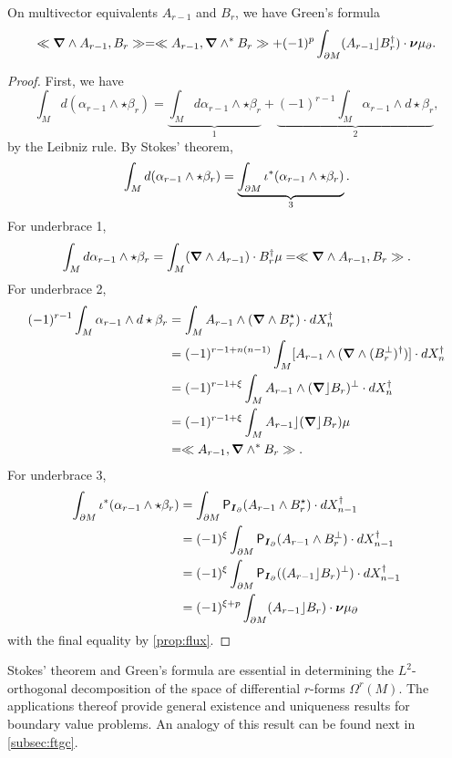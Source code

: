 \begin{proposition}
On multivector equivalents $A_{r-1}$ and $B_r$, we have Green's formula
\begin{equation}
\ll \boldsymbol{\nabla} \wedge A_{r-1}, B_r\gg = \ll A_{r-1}, \boldsymbol{\nabla} \wedge^* B_r\gg + (-1)^{p} \int_{\partial M} (A_{r-1}\rfloor B_r^\dagger) \cdot \boldsymbol{\nu} \mu_\partial.
\end{equation}
\end{proposition}
\begin{proof}
First, we have
\begin{equation}
\int_M d(\alpha_{r-1} \wedge \star \beta_r) = \underbrace{\int_M d\alpha_{r-1} \wedge \star \beta_r}_{1} + \underbrace{(-1)^{r-1} \int_M \alpha_{r-1} \wedge d \star \beta_r}_{2},
\end{equation} 
by the Leibniz rule. By Stokes' theorem,
\begin{equation}
\int_M d(\alpha_{r-1} \wedge \star \beta_r) = \underbrace{\int_{\partial M} \iota^*(\alpha_{r-1} \wedge \star \beta_r)}_{3}.
\end{equation}
For underbrace 1,
\begin{equation}
\int_M d\alpha_{r-1} \wedge \star \beta_r = \int_M (\boldsymbol{\nabla} \wedge A_{r-1}) \cdot B_r^\dagger \mu = \ll \boldsymbol{\nabla} \wedge A_{r-1}, B_r\gg.
\end{equation}
For underbrace 2,
\begin{align}
    (-1)^{r-1}\int_M \alpha_{r-1} \wedge d \star \beta_r  &= \int_M A_{r-1} \wedge (\boldsymbol{\nabla} \wedge B_r^\star) \cdot dX_n^\dagger\\
    &= (-1)^{r-1+n(n-1)} \int_M [A_{r-1} \wedge (\boldsymbol{\nabla} \wedge (B_r^\perp)^\dagger)] \cdot dX_n^\dagger\\
    &= (-1)^{r-1 + \xi} \int_M A_{r-1} \wedge (\boldsymbol{\nabla} \rfloor B_r)^\perp \cdot dX_n^\dagger\\
    &= (-1)^{r-1 + \xi} \int_M A_{r-1} \rfloor (\boldsymbol{\nabla} \rfloor B_r) \mu\\
    &= \ll A_{r-1}, \boldsymbol{\nabla} \wedge^* B_r\gg.
\end{align}
For underbrace 3,
\begin{align}
\int_{\partial M} \iota^*(\alpha_{r-1} \wedge \star \beta_r) &= \int_{\partial M} \mathsf{P}_{\boldsymbol{I}_\partial} (A_{r-1} \wedge B_r^\star) \cdot dX_{n-1}^\dagger\\
&= (-1)^{\xi} \int_{\partial M} \mathsf{P}_{\boldsymbol{I}_\partial} (A_{r-1} \wedge B_r^\perp) \cdot dX_{n-1}^\dagger\\
&= (-1)^{\xi} \int_{\partial M} \mathsf{P}_{\boldsymbol{I}_\partial}( (A_{r-1} \rfloor B_r)^\perp) \cdot dX_{n-1}^\dagger\\
&= (-1)^{\xi+p} \int_{\partial M} (A_{r-1}\rfloor B_r) \cdot \boldsymbol{\nu} \mu_\partial 
\end{align}
with the final equality by \cref{prop:flux}.
\end{proof}
Stokes' theorem and Green's formula are essential in determining the $L^2$-orthogonal decomposition of the space of differential $r$-forms $\Omega^r(M)$. The applications thereof provide general existence and uniqueness results for boundary value problems. An analogy of this result can be found next in \cref{subsec:ftgc}. 

